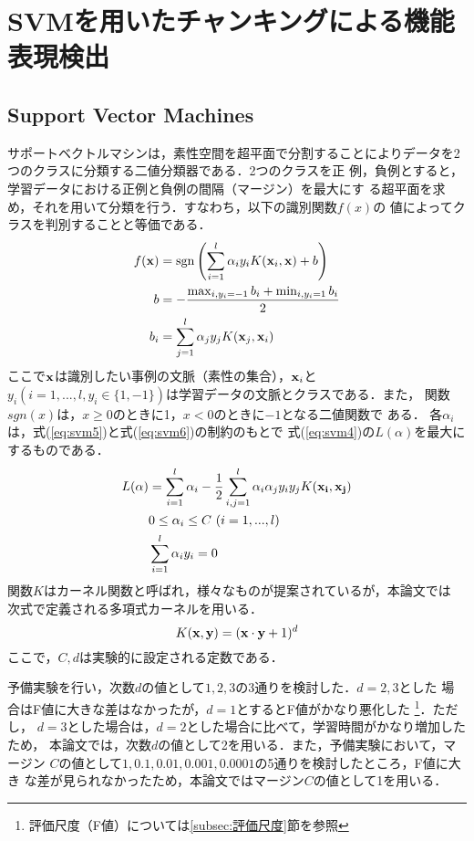 \documentclass[japanese]{jnlp_1.2d}
\begin{document}
\section{SVMを用いたチャンキングによる機能表現検出}
\label{sec:chunking_using_svm}

\subsection{Support Vector Machines}
サポートベクトルマシンは，素性空間を超平面で分割することによりデータを2 
つのクラスに分類する二値分類器である\cite{SVM,tinysvm}．2つのクラスを正
例，負例とすると，学習データにおける正例と負例の間隔（マージン）を最大にす
る超平面を求め，それを用いて分類を行う．すなわち，以下の識別関数$f(x)$の
値によってクラスを判別することと等価である．
\begin{align}
  \label{eq:svm1}
    f({\bf x}) & = \operatorname{sgn} \left( \sum^{l}_{i=1} \alpha_i y_i K({\bf x}_i,{\bf x}) 
	+ b \right)\\
    b & = -\frac{\operatorname{max}_{i,y_i=-1}b_i 
	+ \operatorname{min}_{i,y_i=1}b_i}{2}\nonumber\\
    b_i & = \sum^l_{j=1} \alpha_j y_j K({\bf x}_j,{\bf x}_i) \nonumber
\end{align}
ここで${\bf x}$は識別したい事例の文脈（素性の集合），${\bf x}_{i}$と
$y_i(i=1,...,l, y_i\in\{1,-1\})$は学習データの文脈とクラスである．また，
関数$sgn(x)$は，$x \geq 0$のときに1，$x < 0$のときに$-1$となる二値関数で
ある．\pagebreak
各$\alpha_i$は，式(\ref{eq:svm5})と式(\ref{eq:svm6})の制約のもとで
式(\ref{eq:svm4})の$L(\alpha)$を最大にするものである．
{\allowdisplaybreaks
\begin{align}
  L({\alpha}) & = \sum^l_{i=1} \alpha_i - \frac{1}{2} \sum^l_{i,j=1} \alpha_i \alpha_j y_i y_j K({\bf x_i},{\bf x_j})
  \label{eq:svm4}\\
  & 0 \leq \alpha_i \leq C \, \, (i=1,...,l)
  \label{eq:svm5}\\
  & \sum^l_{i=1} \alpha_i y_i = 0 
  \label{eq:svm6}
\end{align}
}
関数$K$はカーネル関数と呼ばれ，様々なものが提案されているが，本論文では
次式で定義される多項式カーネルを用いる．
\begin{equation}
  \label{eq:svm3}
  K({\bf x},{\bf y}) = ({\bf x}\cdot{\bf y} + 1)^d
\end{equation}
ここで，$C,d$は実験的に設定される定数である．

予備実験を行い，次数$d$の値として$1,2,3$の3通りを検討した．$d=2,3$とした
場合はF値に大きな差はなかったが，$d=1$とするとF値がかなり悪化した
\footnote{評価尺度（F値）については\ref{subsec:評価尺度}節を参照}．ただし，
$d=3$とした場合は，$d=2$とした場合に比べて，学習時間がかなり増加したため，
本論文では，次数$d$の値として2を用いる．また，予備実験において，マージン
$C$の値として$1,0.1,0.01,0.001,0.0001$の5通りを検討したところ，F値に大き
な差が見られなかったため，本論文ではマージン$C$の値として1を用いる．
\end{document}
